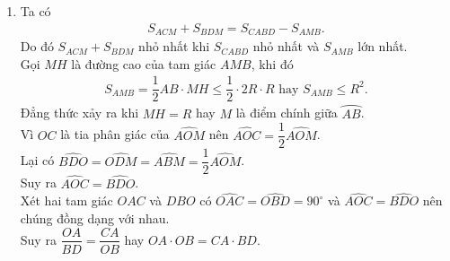 \begin{ex}
{\begin{enumerate}
		 Lại có $\widehat{KAM}=\widehat{ABM}$ (góc nội tiếp và góc tạo bởi tiếp tuyến với dây cung cùng chắn $\wideparen{AM}$).\\
		 Suy ra $\widehat{KAM}=\widehat{ODM}$.\\
		 Xét hai tam giác $AMK$ và $DMO$ có $\widehat{KAM}=\widehat{ODM}$ và $\widehat{AMK}=\widehat{OMD}=90^\circ$ nên $\triangle AMK \backsim \triangle DMO$. Suy ra $\dfrac{MK}{MO}=\dfrac{MA}{MD}$.\\
		 Ta có
		 \begin{eqnarray*}
		  && \widehat{KMO}=\widehat{KMC}+\widehat{CMO}=\widehat{KMC}+90^\circ\\
		  && \widehat{AMD}=\widehat{AMB}+\widehat{BMD}=\widehat{BMD}+90^\circ.
		 \end{eqnarray*}
		 Mà $\widehat{KMC}=\widehat{BMD}$ (hai góc đối đỉnh) nên $\widehat{KMO}=\widehat{AMD}$.\\
		 Xét hai tam giác $KMO$ và $AMD$ có
		 \begin{eqnarray*}
		  && \widehat{KMO}=\widehat{AMD}\\
		  && \dfrac{MK}{MO}=\dfrac{MA}{MD}.
		 \end{eqnarray*}
		 Vậy $\triangle KMO \backsim \triangle AMD$.
		 \item Ta có
		 \begin{eqnarray*}
		  S_{ACM}+S_{BDM}=S_{CABD}-S_{AMB}.
		 \end{eqnarray*}
		 Do đó $S_{ACM}+S_{BDM}$ nhỏ nhất khi $S_{CABD}$ nhỏ nhất và $S_{AMB}$ lớn nhất.\\
		 Gọi $MH$ là đường cao của tam giác $AMB$, khi đó
		 \begin{eqnarray*}
		  S_{AMB}=\dfrac{1}{2}AB\cdot MH \leq \dfrac{1}{2}\cdot 2R \cdot R \text{ hay } S_{AMB} \leq R^2.
		 \end{eqnarray*}
		 Đẳng thức xảy ra khi $MH=R$ hay $M$ là điểm chính giữa $\wideparen{AB}$.\\
		 Vì $OC$ là tia phân giác của $\widehat{AOM}$ nên $\widehat{AOC}=\dfrac{1}{2}\widehat{AOM}$.\\
		 Lại có $\widehat{BDO}=\widehat{ODM}=\widehat{ABM}=\dfrac{1}{2}\widehat{AOM}$.\\
		 Suy ra $\widehat{AOC}=\widehat{BDO}$.\\
		 Xét hai tam giác $OAC$ và $DBO$ có $\widehat{OAC}=\widehat{OBD}=90^\circ$ và $\widehat{AOC}=\widehat{BDO}$ nên chúng đồng dạng với nhau.\\
		 Suy ra $\dfrac{OA}{BD}=\dfrac{CA}{OB}$ hay $OA \cdot OB = CA\cdot BD$.\\

\end{enumerate}}
\end{ex}
